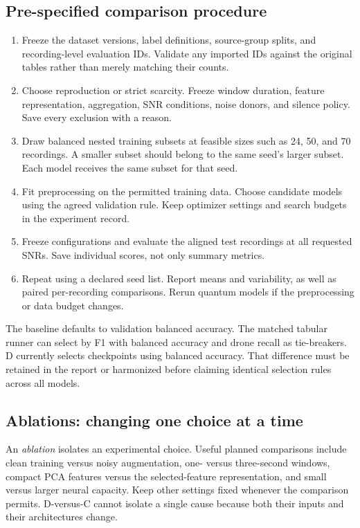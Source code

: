 \documentclass[11pt,letterpaper]{article}
\begin{document}
\subsection{Pre-specified comparison procedure}
\begin{enumerate}
 \item Freeze the dataset versions, label definitions, source-group splits,
 and recording-level evaluation IDs. Validate any imported IDs against the
 original tables rather than merely matching their counts.
 \item Choose reproduction or strict scarcity. Freeze window duration,
 feature representation, aggregation, SNR conditions, noise donors, and
 silence policy. Save every exclusion with a reason.
 \item Draw balanced nested training subsets at feasible sizes such as
 24, 50, and 70 recordings. A smaller subset should belong to the same seed's
 larger subset. Each model receives the same subset for that seed.
 \item Fit preprocessing on the permitted training data. Choose candidate
 models using the agreed validation rule. Keep optimizer settings and search
 budgets in the experiment record.
 \item Freeze configurations and evaluate the aligned test recordings at all
 requested SNRs. Save individual scores, not only summary metrics.
 \item Repeat using a declared seed list. Report means and variability, as
 well as paired per-recording comparisons. Rerun quantum models if the
 preprocessing or data budget changes.
\end{enumerate}
The baseline defaults to validation balanced accuracy. The matched tabular
runner can select by F1 with balanced accuracy and drone recall as tie-breakers.
D currently selects checkpoints using balanced accuracy. That difference
must be retained in the report or harmonized before claiming identical
selection rules across all models.

\subsection{Ablations: changing one choice at a time}
An \emph{ablation} isolates an experimental choice. Useful planned comparisons
include clean training versus noisy augmentation, one- versus three-second
windows, compact PCA features versus the selected-feature representation,
and small versus larger neural capacity. Keep other settings fixed whenever
the comparison permits. D-versus-C cannot isolate a single cause because both
their inputs and their architectures change.
\end{document}
